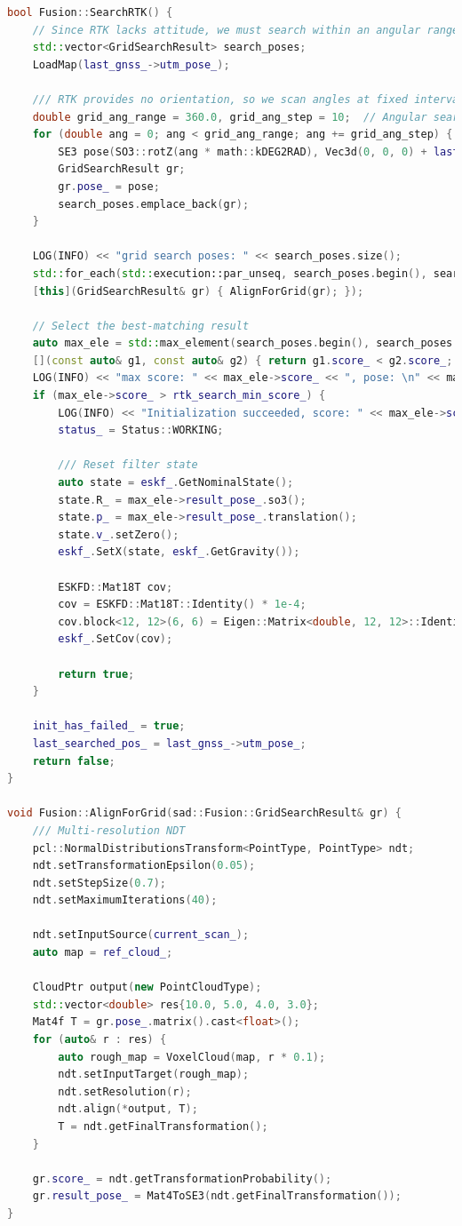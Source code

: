 \begin{lstlisting}[language=c++,caption=/ch10/fusion.cc]  
bool Fusion::SearchRTK() {  
	// Since RTK lacks attitude, we must search within an angular range  
	std::vector<GridSearchResult> search_poses;  
	LoadMap(last_gnss_->utm_pose_);  
	
	/// RTK provides no orientation, so we scan angles at fixed intervals  
	double grid_ang_range = 360.0, grid_ang_step = 10;  // Angular search range and step  
	for (double ang = 0; ang < grid_ang_range; ang += grid_ang_step) {  
		SE3 pose(SO3::rotZ(ang * math::kDEG2RAD), Vec3d(0, 0, 0) + last_gnss_->utm_pose_.translation());  
		GridSearchResult gr;  
		gr.pose_ = pose;  
		search_poses.emplace_back(gr);  
	}  
	
	LOG(INFO) << "grid search poses: " << search_poses.size();  
	std::for_each(std::execution::par_unseq, search_poses.begin(), search_poses.end(),  
	[this](GridSearchResult& gr) { AlignForGrid(gr); });  
	
	// Select the best-matching result  
	auto max_ele = std::max_element(search_poses.begin(), search_poses.end(),  
	[](const auto& g1, const auto& g2) { return g1.score_ < g2.score_; });  
	LOG(INFO) << "max score: " << max_ele->score_ << ", pose: \n" << max_ele->result_pose_.matrix();  
	if (max_ele->score_ > rtk_search_min_score_) {  
		LOG(INFO) << "Initialization succeeded, score: " << max_ele->score_ << ">" << rtk_search_min_score_;  
		status_ = Status::WORKING;  
		
		/// Reset filter state  
		auto state = eskf_.GetNominalState();  
		state.R_ = max_ele->result_pose_.so3();  
		state.p_ = max_ele->result_pose_.translation();  
		state.v_.setZero();  
		eskf_.SetX(state, eskf_.GetGravity());  
		
		ESKFD::Mat18T cov;  
		cov = ESKFD::Mat18T::Identity() * 1e-4;  
		cov.block<12, 12>(6, 6) = Eigen::Matrix<double, 12, 12>::Identity() * 1e-6;  
		eskf_.SetCov(cov);  
		
		return true;  
	}  
	
	init_has_failed_ = true;  
	last_searched_pos_ = last_gnss_->utm_pose_;  
	return false;  
}  

void Fusion::AlignForGrid(sad::Fusion::GridSearchResult& gr) {  
	/// Multi-resolution NDT  
	pcl::NormalDistributionsTransform<PointType, PointType> ndt;  
	ndt.setTransformationEpsilon(0.05);  
	ndt.setStepSize(0.7);  
	ndt.setMaximumIterations(40);  
	
	ndt.setInputSource(current_scan_);  
	auto map = ref_cloud_;  
	
	CloudPtr output(new PointCloudType);  
	std::vector<double> res{10.0, 5.0, 4.0, 3.0};  
	Mat4f T = gr.pose_.matrix().cast<float>();  
	for (auto& r : res) {  
		auto rough_map = VoxelCloud(map, r * 0.1);  
		ndt.setInputTarget(rough_map);  
		ndt.setResolution(r);  
		ndt.align(*output, T);  
		T = ndt.getFinalTransformation();  
	}  
	
	gr.score_ = ndt.getTransformationProbability();  
	gr.result_pose_ = Mat4ToSE3(ndt.getFinalTransformation());  
}  
\end{lstlisting}

